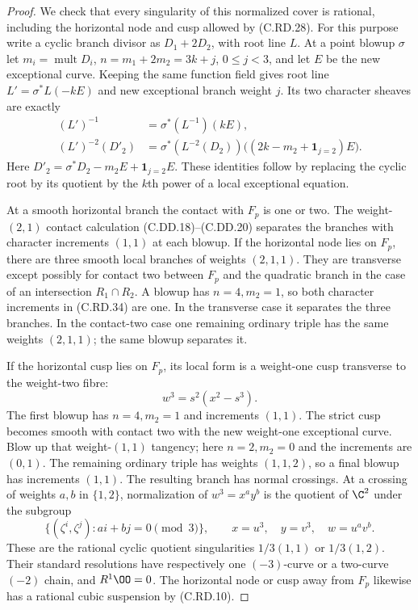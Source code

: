 \begin{proof}
We check that every singularity of this
normalized cover is rational, including the
horizontal node and cusp allowed by (C.RD.28).
For this purpose write a cyclic branch divisor
as $D_1+2D_2$, with root line $L$.
At a point blowup $\sigma$ let
$m_i=\operatorname{mult}D_i$,
$n=m_1+2m_2=3k+j$, $0\le j<3$, and let $E$
be the new exceptional curve. Keeping the
same function field gives root line
$L'=\sigma^*L(-kE)$ and new exceptional
branch weight $j$. Its two character sheaves
are exactly
\[
\begin{split}
 (L')^{-1}&=\sigma^*(L^{-1})(kE),\\
 (L')^{-2}(D'_2)
   &=\sigma^*(L^{-2}(D_2))
       \bigl((2k-m_2+\mathbf1_{j=2})E\bigr).
\end{split}
\tag{C.RD.34}
\]
Here $D'_2=\sigma^*D_2-m_2E+\mathbf1_{j=2}E$.
These identities follow by replacing the
cyclic root by its quotient by the $k$th
power of a local exceptional equation.

At a smooth horizontal branch the contact
with $F_p$ is one or two. The weight-$(2,1)$
contact calculation (C.DD.18)--(C.DD.20)
separates the branches with character
increments $(1,1)$ at each blowup.
If the horizontal node lies on $F_p$, there
are three smooth local branches of weights
$(2,1,1)$. They are transverse except possibly
for contact two between $F_p$ and the
quadratic branch in the case of an intersection
$R_1\cap R_2$. A blowup has $n=4,m_2=1$,
so both character increments in (C.RD.34)
are one. In the transverse case it separates
the three branches. In the contact-two case
one remaining ordinary triple has the same
weights $(2,1,1)$; the same blowup separates it.

If the horizontal cusp lies on $F_p$, its
local form is a weight-one cusp transverse
to the weight-two fibre:
\[
                        w^3=s^2(x^2-s^3).
\tag{C.RD.35}
\]
The first blowup has $n=4,m_2=1$ and
increments $(1,1)$. The strict cusp becomes
smooth with contact two with the new
weight-one exceptional curve. Blow up that
weight-$(1,1)$ tangency; here $n=2,m_2=0$
and the increments are $(0,1)$.
The remaining ordinary triple has weights
$(1,1,2)$, so a final blowup has increments
$(1,1)$. The resulting branch has normal
crossings. At a crossing of weights $a,b$
in $\{1,2\}$, normalization of
$w^3=x^a y^b$ is the quotient of $\C^2$
under the subgroup
\[
 \{(\zeta^i,\zeta^j):ai+bj=0\pmod3\},
 \qquad x=u^3,\quad y=v^3,\quad w=u^av^b.
\]
These are the rational cyclic quotient
singularities $1/3(1,1)$ or $1/3(1,2)$.
Their standard resolutions have respectively
one $(-3)$-curve or a two-curve $(-2)$ chain,
and $R^1\OO=0$. The horizontal node or cusp
away from $F_p$ likewise has a rational
cubic suspension by (C.RD.10).


\end{proof}

